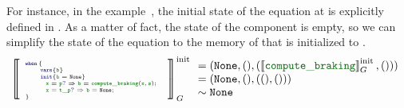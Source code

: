 For instance, in the \aeb example~, the initial state of the 
equation at  is explicitly defined in
. As a matter of fact, the state of the component
 is empty, so we can simplify the state of the  equation to the
memory of  that is initialized to \No.
\begin{equation}
    \initsync{\mathtiny{\whenTab{\idf{b}}{\idf{b} = \No}{
                \begin{array}{l}
                    \detect{\idf{x}}{\idf{p}} \Rightarrow { \idf{b} = \idf{compute\_braking}(\idf{x}, \idf{s}); } \\
                    \detect{\idf{x}}{\idf{t\_p}} \Rightarrow { \idf{b} = \No;  }                                  \\
                \end{array}
            }}}
    \begin{array}{l}
        = (\No, (), (\initsync{\idf{compute\_braking}}, ())) \\
        = (\No, (), ((), ()))                                \\
        \sim \No
    \end{array}
    \label{eq:semantics:grsync:opsem:init:eq:when:ex}
\end{equation}

